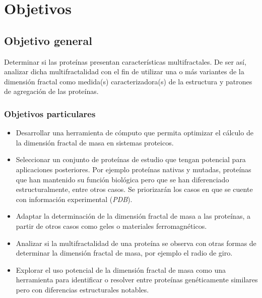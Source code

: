 \chapter{Objetivos}
\section{Objetivo general}


Determinar si las prote\'{i}nas presentan caracter\'{i}sticas multifractales. De ser as\'{i}, analizar dicha multifractalidad con el fin de utilizar una o m\'{a}s variantes de la
dimensi\'{o}n fractal como medida(s) caracterizadora(s)
de la estructura y patrones de agregaci\'{o}n de las prote\'{i}nas.



\subsection{Objetivos particulares}

\begin{itemize}

\item Desarrollar una herramienta de c\'{o}mputo que permita optimizar el c\'{a}lculo de la dimensi\'{o}n fractal de masa en sistemas proteicos.

\item Seleccionar un conjunto de prote\'{i}nas de estudio que tengan potencial para aplicaciones posteriores. Por ejemplo prote\'{i}nas nativas y mutadas, prote\'{i}nas que han mantenido su funci\'{o}n biol\'{o}gica pero que se han diferenciado estructuralmente, entre otros casos. Se priorizar\'{a}n los casos en que se cuente con informaci\'{o}n
experimental (\textit{PDB}).

\item Adaptar la determinaci\'{o}n de la dimensi\'{o}n fractal de masa a las prote\'{i}nas, a partir de otros casos como geles o materiales ferromagn\'{e}ticos.


\item Analizar si la multifractalidad de una prote\'{i}na se observa con otras formas de determinar la dimensi\'{o}n fractal de masa, por ejemplo el radio de giro.

\item Explorar el uso potencial de la dimensi\'{o}n fractal de masa como una herramienta para identificar o resolver entre prote\'{i}nas gen\'{e}ticamente similares pero con diferencias estructurales notables.

\end{itemize}

\color{black}